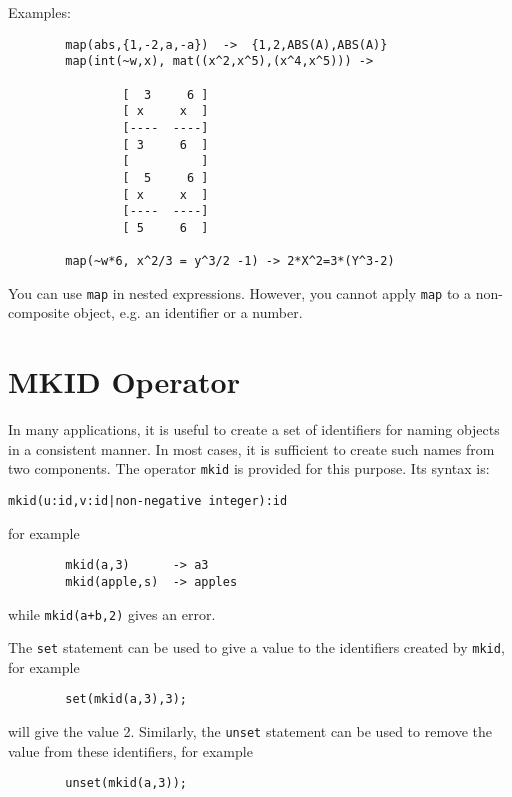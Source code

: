 Examples:
\begin{verbatim}
        map(abs,{1,-2,a,-a})  ->  {1,2,ABS(A),ABS(A)}
        map(int(~w,x), mat((x^2,x^5),(x^4,x^5))) ->

                [  3     6 ]
                [ x     x  ]
                [----  ----]
                [ 3     6  ]
                [          ]
                [  5     6 ]
                [ x     x  ]
                [----  ----]
                [ 5     6  ]

        map(~w*6, x^2/3 = y^3/2 -1) -> 2*X^2=3*(Y^3-2)
\end{verbatim}

You can use \texttt{map} in nested expressions. However, you cannot
apply \texttt{map} to a non-composite object, e.g. an identifier or a number.


\section{MKID Operator}
\hypertarget{operator:MKID}{}
In many applications, it is useful to create a set of identifiers for
naming objects in a consistent manner. In most cases, it is sufficient to
create such names from two components. The operator \texttt{mkid} is provided
for this purpose. Its syntax is:
\begin{verbatim}
mkid(u:id,v:id|non-negative integer):id
\end{verbatim}
for example
\begin{verbatim}
        mkid(a,3)      -> a3
        mkid(apple,s)  -> apples
\end{verbatim}
while \texttt{mkid(a+b,2)} gives an error.

The \texttt{set} statement can be used to give a value to the
identifiers created by \texttt{mkid}, for example
\begin{verbatim}
        set(mkid(a,3),3);
\end{verbatim}
will give  the value 2.
Similarly, the \texttt{unset} statement can be used to
remove the value from these identifiers, for example
\begin{verbatim}
        unset(mkid(a,3));
\end{verbatim}

